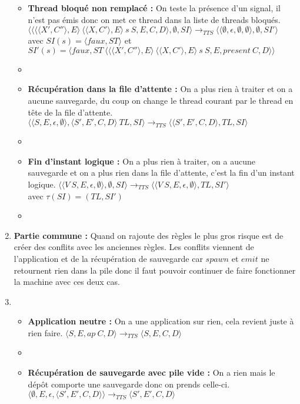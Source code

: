 \documentclass[10pt,a4paper]{article}
\begin{document}
\begin{enumerate}
\begin{itemize}
						\item[] \textbf{Thread bloqué non remplacé :} On teste la présence d'un signal, il n'est pas émis donc on met ce thread dans la liste de threads bloqués.
						\smallbreak 
						$\langle\langle \langle\langle X',C''\rangle,E\rangle~\langle\langle X,C'\rangle,E\rangle~s~S,E,C,D\rangle,\emptyset,SI\rangle 
						\longrightarrow_{TTS} 
						\langle\langle \emptyset,\epsilon,\emptyset,\emptyset\rangle,\emptyset,SI'\rangle$
						\\avec $SI(s) = \langle faux,ST\rangle$
						et $SI'(s) = \langle faux,ST~\langle\langle\langle X',C''\rangle,E\rangle~\langle\langle X,C'\rangle,E\rangle~s~S,E,present~C,D\rangle\rangle$
						\item[]
							
						\item[] \textbf{Récupération dans la file d'attente :} On a plus rien à traiter et on a aucune sauvegarde, du coup on change le thread courant par le thread en tête de la file d'attente.
						\smallbreak
						$\langle\langle S,E,\epsilon,\emptyset\rangle,\langle S',E',C,D\rangle~TL,SI\rangle 
						\longrightarrow_{TTS} 
						\langle\langle S',E',C,D\rangle,TL,SI\rangle$
						\item[]
							
						\item[] \textbf{Fin d'instant logique :} On a plus rien à traiter, on a aucune sauvegarde et on a plus rien dans la file d'attente, c'est la fin d'un instant logique.
						\smallbreak
						$\langle\langle V~S,E,\epsilon,\emptyset \rangle ,\emptyset,SI\rangle 
						\longrightarrow_{TTS} 
						\langle\langle V~S,E,\epsilon,\emptyset\rangle,TL,SI'\rangle$
						\\avec $\tau(SI) = (TL,SI')$ 
						\item[]
							
					\end{itemize}
					\item[] \textbf{Partie commune :} Quand on rajoute des règles le plus gros risque est de créer des conflits avec les anciennes règles. Les conflits viennent de l'application et de la récupération de sauvegarde car $spawn$ et $emit$ ne retournent rien dans la pile donc il faut pouvoir continuer de faire fonctionner la machine avec ces deux cas. 
					\item[]
					\begin{itemize}
						\item[] \textbf{Application neutre :} On a une application sur rien, cela revient juste à rien faire.
						\smallbreak 
						$\langle S,E,ap~C,D\rangle
						\longrightarrow_{TTS} 
						\langle S,E,C,D\rangle$
						\item[]
						
				        \item[] \textbf{Récupération de sauvegarde avec pile vide :}  On a rien mais le dépôt comporte une sauvegarde donc on prends celle-ci.
						\smallbreak  
						$\langle \emptyset,E,\epsilon,\langle S',E',C,D\rangle\rangle
						\longrightarrow_{TTS} 
						\langle S',E',C,D\rangle$
					\end{itemize}
				\end{enumerate}
\end{document}
